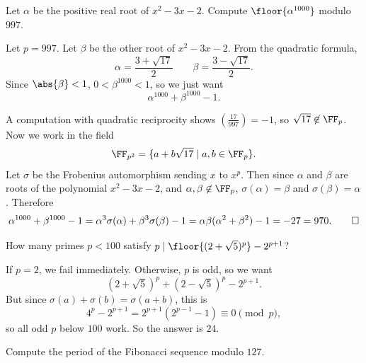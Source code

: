 \documentclass[11pt]{scrartcl}
\begin{document}
\begin{example}\label{exa:bprp}
	Let $\alpha$ be the positive real root of $x^2 - 3x - 2$. Compute $\floor{\alpha^{1000}}$ modulo $997$.
\end{example}

\begin{solution}{}
    Let $p = 997$. Let $\beta$ be the other root of $x^2 - 3x - 2$. From the quadratic formula,
    \[\alpha = \frac{3 + \sqrt{17}}{2} \qquad \beta = \frac{3 - \sqrt{17}}{2}.\]
    Since $\abs{\beta} < 1$, $0 < \beta^{1000} < 1$, so we just want
    \[\alpha^{1000} + \beta^{1000} - 1.\]

    A computation with quadratic reciprocity shows $(\frac{17}{997}) = -1$, so $\sqrt{17} \not\in \FF_p$. Now we work in the field
    \[\FF_{p^2} = \{a + b\sqrt{17} \mid a,b \in \FF_p\}.\]
    Let $\sigma$ be the Frobenius automorphism sending $x$ to $x^p$. Then since $\alpha$ and $\beta$ are roots of the polynomial $x^2 - 3x - 2$, and $\alpha,\beta \not\in \FF_p$, $\sigma(\alpha) = \beta$ and $\sigma(\beta) = \alpha$. Therefore
    \[\alpha^{1000} + \beta^{1000} - 1 = \alpha^3\sigma(\alpha) + \beta^3\sigma(\beta) - 1 = \alpha\beta(\alpha^2 + \beta^2) - 1 = -27 = 970. \qedhere\]
\end{solution}

\begin{example}\label{exa:china}
    How many primes $p < 100$ satisfy $p \mid \floor{(2 + \sqrt 5)^p} - 2^{p + 1}$?
\end{example}

\begin{solution}{}
    If $p = 2$, we fail immediately. Otherwise, $p$ is odd, so we want
    \[(2 + \sqrt5)^p + (2 - \sqrt5)^p - 2^{p + 1}.\]
    But since $\sigma(a) + \sigma(b) = \sigma(a + b)$, this is
    \[4^p - 2^{p + 1} = 2^{p + 1}(2^{p - 1} - 1) \equiv 0 \pmod p,\]
    so all odd $p$ below $100$ work. So the answer is $24$.
\end{solution}

\begin{example}[HMMT 2017/A9]\label{exa:fibonacci}
    Compute the period of the Fibonacci sequence modulo $127$.
\end{example}
\end{document}
